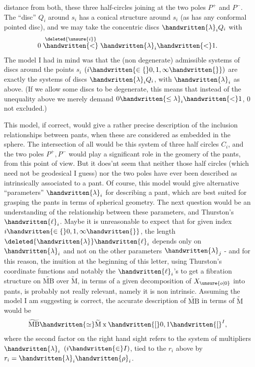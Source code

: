 
distance from both, these three half-circles joining at the two poles $P^+$ and $P^-$. The ``disc'' $Q_i$ around $s_i$ has a conical structure around $s_i$ (as has any conformal pointed disc), and we may take the concentric  discs $\handwritten{\lambda}_i Q_i$ with
\[
0\mathrel{\overset{\deleted{\unsure{i}}}{\handwritten{<}}}\handwritten{\lambda}_i\handwritten{<}1.
\]
The model I had in mind was that the (non degenerate) admissible systems of discs around the points $s_i$ $(i\handwritten{\in\{}0,1,\infty\handwritten{\}})$ are exactly the systems of discs $\handwritten{\lambda}_i Q_i$, with $\handwritten{\lambda}_i$ as above. (If we allow some discs to be degenerate, this means that instead of the unequality above we merely demand $0\handwritten{\leq\lambda}_i\handwritten{<}1$, $0$ not excluded.)

This model, if correct, would give a rather precise description of the inclusion relationships between pants, when these are considered as embedded in the sphere. The intersection of all would be this system of three half circles $C_i$, and the two poles $P^+,P^-$ would play a significant role in the geomery of the pants, from this point of view. But it does'nt seem that neither those half circles (which need not be geodesical I guess)\handwritten{,} nor the two poles\handwritten{,} have ever been described as intrinsically associated to a pant. Of course, this model would give alternative ``parameters'' $\handwritten{\lambda}_i$ for describing a pant, which are best suited for grasping the pants in terms of spherical geometry. The next question would be an understanding of the relationship between these parameters, and Thurston's $\handwritten{\ell}_i$. Maybe it is unreasonable to expect that for given index $i\handwritten{\in\{}0,1,\infty\handwritten{\}}$, the length $\deleted{\handwritten{\lambda}}\handwritten{\ell}_i$ depends only on $\handwritten{\lambda}_i$ and not on the other parameters $\handwritten{\lambda}_j$ - and for this reason,  the inuition at the beginning of this letter, using Thurston's coordinate functions and notably the $\handwritten{\ell}_i$'s to get a fibration structure on $\widetilde{\mathrm{MB}}$ over $\widetilde{\mathrm M}$, in terms of a given decomposition of $X_{\unsure{o|0}}$ into pants, is probably not really relevant, namely it is non intrinsic. Assuming the model I am suggesting is correct, the accurate description  of $\widetilde{\mathrm{MB}}$ in terms of $\widetilde{\mathrm M}$ would be
\[
\widetilde{\mathrm{MB}}\handwritten{\simeq}\widetilde{\mathrm M}\mathbin{\mathrm{x}}\handwritten{[}0,1\handwritten{[}^{I},
\]
where the second factor on the right hand sight refers to the system of multipliers $\handwritten{\lambda}_i$ $(i\handwritten{\in} I)$, tied to the $r_i$ above by $r_i=\handwritten{\lambda}_i\handwritten{\rho}_i$.

